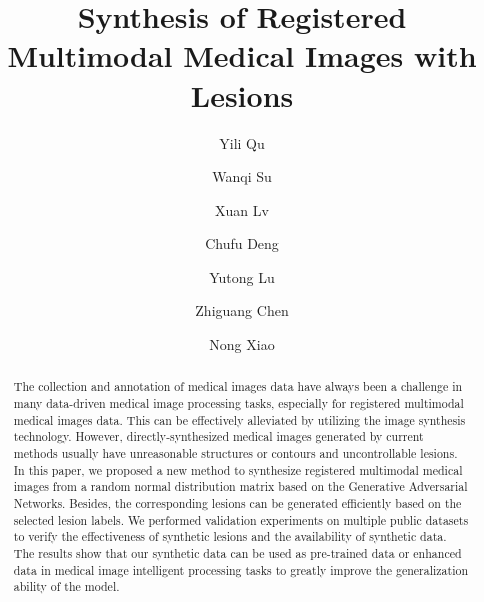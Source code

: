 \documentclass[runningheads]{llncs}
\begin{document}
	\title{Synthesis of Registered Multimodal
		Medical Images with Lesions}
	\author{ Yili Qu \and Wanqi Su \and Xuan Lv \and Chufu Deng 
		\and Yutong Lu \and Zhiguang Chen \and Nong Xiao}
	\maketitle       %
	\begin{abstract}
	The collection and annotation of medical images data have always been a challenge in many data-driven medical image processing tasks, especially for registered multimodal medical images data. This can be effectively alleviated by utilizing the image synthesis technology. However, directly-synthesized medical images generated by current methods usually have unreasonable structures or contours and uncontrollable lesions. In this paper, we proposed a new method to synthesize registered multimodal medical images from a random normal distribution matrix based on the Generative Adversarial Networks. Besides, the corresponding lesions can be generated efficiently based on the selected lesion labels. We performed validation experiments on multiple public datasets to verify the effectiveness of synthetic lesions and the availability of synthetic data. The results show that our synthetic data can be used as pre-trained data or enhanced data in medical image intelligent processing tasks to greatly improve the generalization ability of the model. 
		
	\end{abstract}
\end{document}
